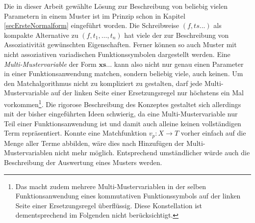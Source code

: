 Die in dieser Arbeit gewählte Lösung zur Beschreibung von beliebig vielen Parametern in einem Muster ist im Prinzip schon in Kapitel \ref{secErsteNormalform} eingeführt worden. Die Schreibweise $(f, ts...)$ als kompakte Alternative zu $(f, t_1, \dots, t_n)$ hat viele der zur Beschreibung von Assoziativität gewünschten Eigenschaften. Ferner können so auch Muster mit nicht assoziativen variadischen Funktionssymbolen dargestellt werden. Eine \textit{Multi-Mustervariable} der Form $\mathbf{xs...}$ kann also nicht nur genau einen Parameter in einer Funktionsanwendung matchen, sondern beliebig viele, auch keinen. Um den Matchalgorithmus nicht zu kompliziert zu gestalten, darf jede Multi-Mustervariable auf der linken Seite einer Ersetzungsregel nur höchstens ein Mal vorkommen\footnote{Das macht zudem mehrere Multi-Mustervariablen in der selben Funktionsanwendung eines kommutativen Funktionssymbols auf der linken Seite einer Ersetzungsregel überflüssig. Diese Konstellation ist dementsprechend im Folgenden nicht berücksichtigt.}. Die rigorose Beschreibung des Konzeptes gestaltet sich allerdings mit der bisher eingeführten Ideen schwierig, da eine Multi-Mustervariable nur Teil einer Funktionsanwendung ist und damit auch alleine keinen vollständigen Term repräsentiert. Konnte eine Matchfunktion $v_p \colon X \rightarrow T$ vorher einfach auf die Menge aller Terme abbilden, wäre dies nach Hinzufügen der Multi-Mustervariablen nicht mehr möglich. Entsprechend umständlicher würde auch die Beschreibung der Auswertung eines Musters werden. \\

